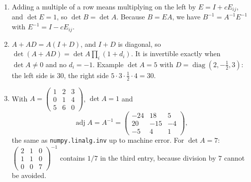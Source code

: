 \begin{enumerate}[label=\textbf{8.\arabic*}]
  \item Adding a multiple of a row means multiplying on the left by
        $E=I+cE_{ij}$, and $\det E=1$, so $\det B=\det A$. Because $B=EA$,
        we have $B^{-1}=A^{-1}E^{-1}$ with $E^{-1}=I-cE_{ij}$.

  \item $A+AD=A(I+D)$, and $I+D$ is diagonal, so
        $\det(A+AD)=\det A\prod_{i}(1+d_{i})$. It is invertible exactly when
        $\det A\ne0$ and no $d_{i}=-1$. Example $\det A=5$ with
        $D=\operatorname{diag}(2,-\tfrac12,3)$: the left side is $30$, the right side
        $5\cdot3\cdot\tfrac12\cdot4=30$.

  \item With $A=\begin{pmatrix}1&2&3\\0&1&4\\5&6&0\end{pmatrix}$,
        $\det A=1$ and
        \[
          \operatorname{adj}A=A^{-1}=
          \begin{pmatrix}-24&18&5\\20&-15&-4\\-5&4&1\end{pmatrix},
        \]
        the same as \texttt{numpy.linalg.inv} up to machine error. For
        $\det A=7$:
        $\begin{pmatrix}2&1&0\\1&1&0\\0&0&7\end{pmatrix}^{-1}$ contains
        $1/7$ in the third entry, because division by $7$ cannot be avoided.
\end{enumerate}

